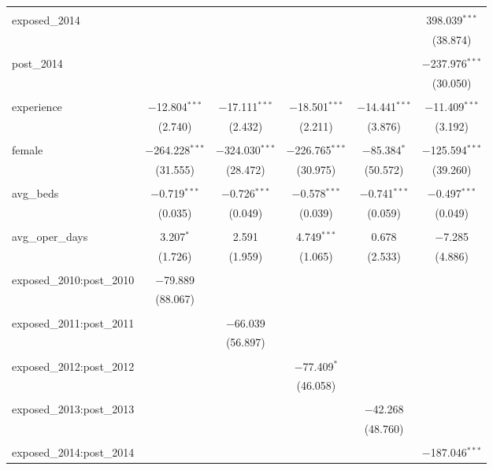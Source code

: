 \begin{table}[!htbp]
\begin{tabular}{@{\extracolsep{5pt}}lccccc}
  & & & & & \\ 
 exposed\_2014 &  &  &  &  & 398.039$^{***}$ \\ 
  &  &  &  &  & (38.874) \\ 
  & & & & & \\ 
 post\_2014 &  &  &  &  & $-$237.976$^{***}$ \\ 
  &  &  &  &  & (30.050) \\ 
  & & & & & \\ 
 experience & $-$12.804$^{***}$ & $-$17.111$^{***}$ & $-$18.501$^{***}$ & $-$14.441$^{***}$ & $-$11.409$^{***}$ \\ 
  & (2.740) & (2.432) & (2.211) & (3.876) & (3.192) \\ 
  & & & & & \\ 
 female & $-$264.228$^{***}$ & $-$324.030$^{***}$ & $-$226.765$^{***}$ & $-$85.384$^{*}$ & $-$125.594$^{***}$ \\ 
  & (31.555) & (28.472) & (30.975) & (50.572) & (39.260) \\ 
  & & & & & \\ 
 avg\_beds & $-$0.719$^{***}$ & $-$0.726$^{***}$ & $-$0.578$^{***}$ & $-$0.741$^{***}$ & $-$0.497$^{***}$ \\ 
  & (0.035) & (0.049) & (0.039) & (0.059) & (0.049) \\ 
  & & & & & \\ 
 avg\_oper\_days & 3.207$^{*}$ & 2.591 & 4.749$^{***}$ & 0.678 & $-$7.285 \\ 
  & (1.726) & (1.959) & (1.065) & (2.533) & (4.886) \\ 
  & & & & & \\ 
 exposed\_2010:post\_2010 & $-$79.889 &  &  &  &  \\ 
  & (88.067) &  &  &  &  \\ 
  & & & & & \\ 
 exposed\_2011:post\_2011 &  & $-$66.039 &  &  &  \\ 
  &  & (56.897) &  &  &  \\ 
  & & & & & \\ 
 exposed\_2012:post\_2012 &  &  & $-$77.409$^{*}$ &  &  \\ 
  &  &  & (46.058) &  &  \\ 
  & & & & & \\ 
 exposed\_2013:post\_2013 &  &  &  & $-$42.268 &  \\ 
  &  &  &  & (48.760) &  \\ 
  & & & & & \\ 
 exposed\_2014:post\_2014 &  &  &  &  & $-$187.046$^{***}$ \\ 

\end{tabular}
\end{table}

